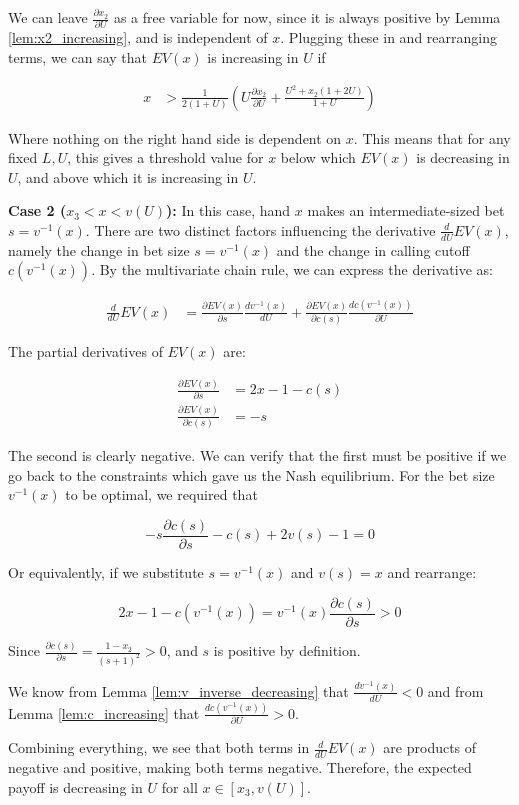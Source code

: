\documentclass[../../main/main.tex]{subfiles}
\begin{document}
\begin{customproof}
    We can leave $\frac{\partial x_2}{\partial U}$ as a free variable for now, since it is always positive by Lemma \ref{lem:x2_increasing}, and is independent of $x$. Plugging these in and rearranging terms, we can say that $EV(x)$ is increasing in $U$ if 

    \begin{align*}
        x & > \frac{1}{2(1+U)} \left( U \frac{\partial x_2}{\partial U} + \frac{U^2 + x_2(1 + 2U)}{1+U} \right)
    \end{align*}

    Where nothing on the right hand side is dependent on $x$. This means that for any fixed $L, U$, this gives a threshold value for $x$ below which $EV(x)$ is decreasing in $U$, and above which it is increasing in $U$.

    \textbf{Case 2 ($x_3 < x < v(U)$):} In this case, hand $x$ makes an intermediate-sized bet $s = v^{-1}(x)$. There are two distinct factors influencing the derivative $\frac{d}{dU} EV(x)$, namely the change in bet size $s = v^{-1}(x)$ and the change in calling cutoff $c(v^{-1}(x))$. By the multivariate chain rule, we can express the derivative as:

    \begin{align*}
        \frac{d}{dU} EV(x) & = \frac{\partial EV(x)}{\partial s} \frac{d v^{-1}(x)}{d U} + \frac{\partial EV(x)}{\partial c(s)} \frac{d c(v^{-1}(x))}{\partial U}
    \end{align*}

    The partial derivatives of $EV(x)$ are:

    \begin{align*}
        \frac{\partial EV(x)}{\partial s} & = 2x - 1 - c(s) \\
        \frac{\partial EV(x)}{\partial c(s)} & = - s
    \end{align*}

    The second is clearly negative. We can verify that the first must be positive if we go back to the constraints which gave us the Nash equilibrium. For the bet size $v^{-1}(x)$ to be optimal, we required that 

    $$ -s \frac{\partial c(s)}{\partial s} - c(s) + 2v(s) - 1 = 0$$

    Or equivalently, if we substitute $s= v^{-1}(x)$ and $v(s) = x$ and rearrange:

    $$ 2x -1 -c(v^{-1}(x)) = v^{-1}(x) \frac{\partial c(s)}{\partial s} > 0$$

    Since $\frac{\partial c(s)}{\partial s} = \frac{1-x_2}{(s+1)^2} > 0$, and $s$ is positive by definition.

    We know from Lemma \ref{lem:v_inverse_decreasing} that $\frac{d v^{-1}(x)}{d U} < 0$ and from Lemma \ref{lem:c_increasing} that $\frac{d c(v^{-1}(x))}{\partial U} > 0$.

    Combining everything, we see that both terms in $\frac{d}{dU} EV(x)$ are products of negative and positive, making both terms negative. Therefore, the expected payoff is decreasing in $U$ for all $x \in [x_3, v(U)]$.

\end{customproof}
\end{document}
